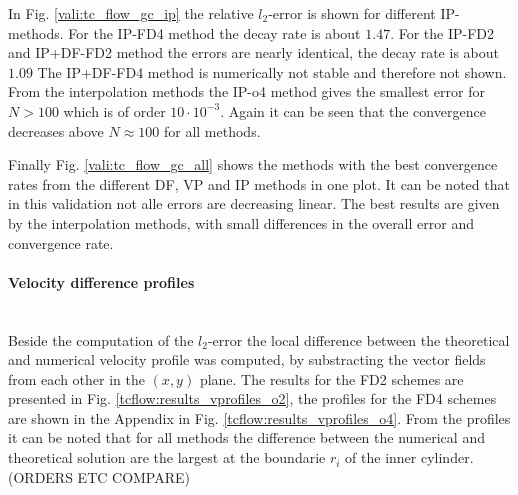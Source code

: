 In Fig. \ref{vali:tc_flow_gc_ip} the relative $l_2$-error is shown for different IP-methods.
For the IP-FD4 method the decay rate is about $1.47$.
For the IP-FD2 and IP+DF-FD2 method the errors are nearly  identical, the decay rate is about $1.09$
The IP+DF-FD4 method is numerically not stable and therefore not shown.
From the interpolation methods the IP-o4 method gives the smallest error for $N>100$ which is of order $10 \cdot 10^{-3}$.
Again it can be seen that the convergence decreases above $N\approx100$ for all methods.


Finally Fig. \ref{vali:tc_flow_gc_all} shows the methods with the best convergence
rates from the different DF, VP and IP methods in one plot.
It can be noted that in this validation not alle errors are decreasing linear.
The best results are given by the interpolation methods, with small differences in the overall error
and convergence rate.

\paragraph{Velocity difference profiles}\mbox{}\\

Beside the computation of the $l_2$-error the local difference between the theoretical and numerical velocity
profile was computed, by substracting the vector fields from each other in the $(x, y)$ plane.
The results for the FD2 schemes are presented in Fig. \ref{tcflow:results_vprofiles_o2}, the profiles
for the FD4 schemes are shown in the Appendix in Fig. \ref{tcflow:results_vprofiles_o4}.
From the profiles it can be noted that for all methods the difference between the numerical and
theoretical solution are the largest at the boundarie $r_i$ of the  inner cylinder.
(ORDERS ETC COMPARE)

